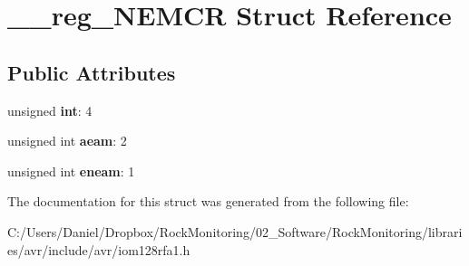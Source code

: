 \hypertarget{struct____reg___n_e_m_c_r}{}\section{\+\_\+\+\_\+reg\+\_\+\+N\+E\+M\+CR Struct Reference}
\label{struct____reg___n_e_m_c_r}
\subsection*{Public Attributes}
\begin{DoxyCompactItemize}
\item 
unsigned {\bfseries int}\+: 4\hypertarget{struct____reg___n_e_m_c_r_a8681baf1444b9de36f59eb07eb7b3d45}{}\label{struct____reg___n_e_m_c_r_a8681baf1444b9de36f59eb07eb7b3d45}

\item 
unsigned int {\bfseries aeam}\+: 2\hypertarget{struct____reg___n_e_m_c_r_aa3d1a562b87b11f2789bec7189a3aa9b}{}\label{struct____reg___n_e_m_c_r_aa3d1a562b87b11f2789bec7189a3aa9b}

\item 
unsigned int {\bfseries eneam}\+: 1\hypertarget{struct____reg___n_e_m_c_r_aca9babd37b62475ea491dd1507336892}{}\label{struct____reg___n_e_m_c_r_aca9babd37b62475ea491dd1507336892}

\end{DoxyCompactItemize}


The documentation for this struct was generated from the following file\+:\begin{DoxyCompactItemize}
\item 
C\+:/\+Users/\+Daniel/\+Dropbox/\+Rock\+Monitoring/02\+\_\+\+Software/\+Rock\+Monitoring/libraries/avr/include/avr/iom128rfa1.\+h\end{DoxyCompactItemize}
